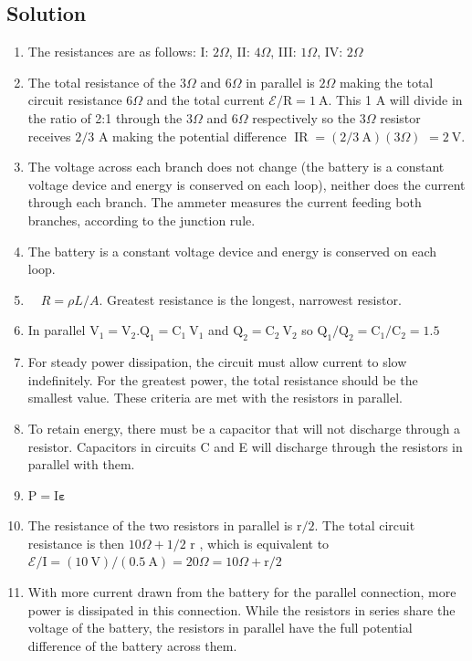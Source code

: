 \begin{enumerate}
\section*{Solution}
\begin{enumerate}
  \item The resistances are as follows: I: $2 \Omega$, II: $4 \Omega$, III: $1 \Omega$, IV: $2 \Omega$
  \item The total resistance of the $3 \Omega$ and $6 \Omega$ in parallel is $2 \Omega$ making the total circuit resistance $6 \Omega$ and the total current $\mathcal{E} / \mathrm{R}=1 \mathrm{~A}$. This 1 A will divide in the ratio of 2:1 through the $3 \Omega$ and $6 \Omega$ respectively so the $3 \Omega$ resistor receives $2 / 3$ A making the potential difference $\operatorname{IR}=(2 / 3 \mathrm{~A})(3 \Omega)$ $=2 \mathrm{~V}$.
  \item The voltage across each branch does not change (the battery is a constant voltage device and energy is conserved on each loop), neither does the current through each branch. The ammeter measures the current feeding both branches, according to the junction rule.
  \item The battery is a constant voltage device and energy is conserved on each loop.
  \item $\quad R=\rho L / A$. Greatest resistance is the longest, narrowest resistor.
  \item In parallel $\mathrm{V}_{1}=\mathrm{V}_{2} . \mathrm{Q}_{1}=\mathrm{C}_{1} \mathrm{~V}_{1}$ and $\mathrm{Q}_{2}=\mathrm{C}_{2} \mathrm{~V}_{2}$ so $\mathrm{Q}_{1} / \mathrm{Q}_{2}=\mathrm{C}_{1} / \mathrm{C}_{2}=1.5$
  \item For steady power dissipation, the circuit must allow current to slow indefinitely. For the greatest power, the total resistance should be the smallest value. These criteria are met with the resistors in parallel.
  \item To retain energy, there must be a capacitor that will not discharge through a resistor. Capacitors in circuits C and E will discharge through the resistors in parallel with them.
  \item $\mathrm{P}=\mathrm{I} \boldsymbol{\varepsilon}$
  \item The resistance of the two resistors in parallel is $\mathrm{r} / 2$. The total circuit resistance is then $10 \Omega+1 / 2$ r , which is equivalent to $\mathcal{E} / \mathrm{I}=(10 \mathrm{~V}) /(0.5 \mathrm{~A})=20 \Omega=10 \Omega+\mathrm{r} / 2$
  \item With more current drawn from the battery for the parallel connection, more power is dissipated in this connection. While the resistors in series share the voltage of the battery, the resistors in parallel have the full potential difference of the battery across them.

\end{enumerate}
\end{enumerate}
